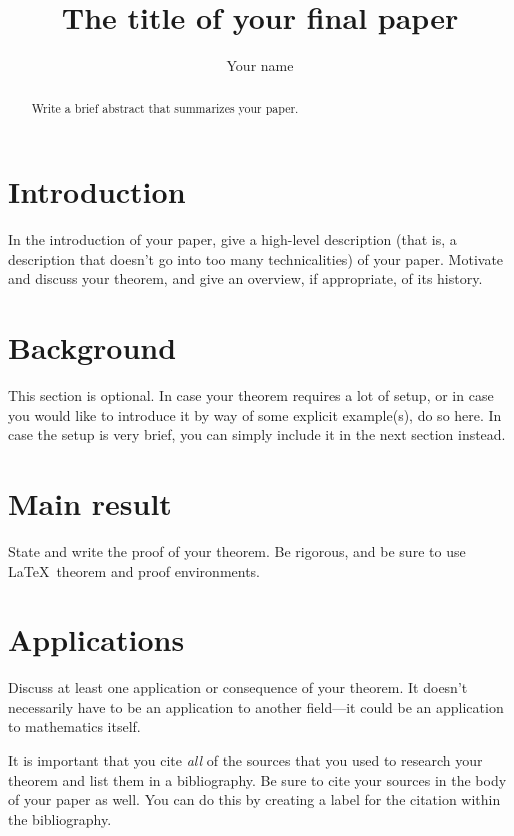 \documentclass[12pt,a4paper,reqno,parskip=full]{amsart}
\numberwithin{equation}{section}
\theoremstyle{plain}
\theoremstyle{definition}
\begin{document}
\title{The title of your final paper}

\author{Your name}

\begin{abstract}
Write a brief abstract that summarizes your paper.
\end{abstract}

\maketitle



\section{Introduction}

In the introduction of your paper, give a high-level description (that is, a description that doesn't go into too many technicalities) of your paper. Motivate and discuss your theorem, and give an overview, if appropriate, of its history.

\section{Background}

This section is optional. In case your theorem requires a lot of setup, or in case you would like to introduce it by way of some explicit example(s), do so here. In case the setup is very brief, you can simply include it in the next section instead.

\section{Main result}

State and write the proof of your theorem. Be rigorous, and be sure to use \LaTeX\ theorem and proof environments.

\section{Applications}

Discuss at least one application or consequence of your theorem. It doesn't necessarily have to be an application to another field---it could be an application to mathematics itself.

\begin{thebibliography}{10}

 It is important that you cite \emph{all} of the sources that you used to research your theorem and list them in a bibliography. Be sure to cite your sources in the body of your paper as well. You can do this by creating a label for the citation within the bibliography.

\end{thebibliography}
\end{document}
